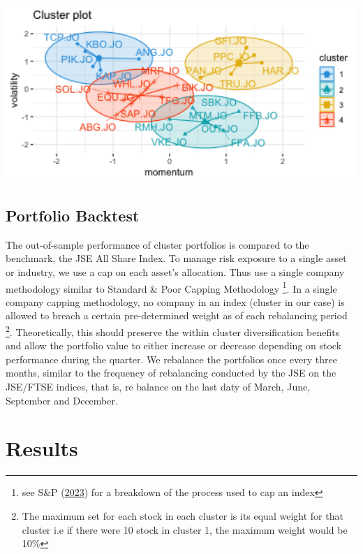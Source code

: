 \documentclass[11pt,preprint, authoryear]{elsarticle}
\let\origfigure\figure
\let\endorigfigure\endfigure
\renewenvironment{figure}[1][2] {
    \expandafter\origfigure\expandafter[H]
} {
    \endorigfigure
}
\numberwithin{equation}{section}
\numberwithin{figure}{section}
\numberwithin{table}{section}
\let\rmarkdownfootnote\footnote%
\def\footnote{\protect\rmarkdownfootnote}
\begin{document}
\begin{figure}[H]

\includegraphics[width=5.56in]{images/clusters_image} \hfill{}

\caption{ Clusters Results from Highest Silhoutte \label{fig2}}\label{fig:unnamed-chunk-2}
\end{figure}

\hypertarget{portfolio-backtest}{%
\subsection{\texorpdfstring{Portfolio Backtest
\label{back}}{Portfolio Backtest }}\label{portfolio-backtest}}

The out-of-sample performance of cluster portfolios is compared to the
benchmark, the JSE All Share Index. To manage risk exposure to a single
asset or industry, we use a cap on each asset's allocation. Thus use a
single company methodology similar to Standard \& Poor Capping
Methodology \footnote{see S\&P (\protect\hyperlink{ref-sp}{2023}) for a
  breakdown of the process used to cap an index}. In a single company
capping methodology, no company in an index (cluster in our case) is
allowed to breach a certain pre-determined weight as of each rebalancing
period \footnote{The maximum set for each stock in each cluster is its
  equal weight for that cluster i.e if there were 10 stock in cluster 1,
  the maximum weight would be 10\%}. Theoretically, this should preserve
the within cluster diversification benefits and allow the portfolio
value to either increase or decrease depending on stock performance
during the quarter. We rebalance the portfolios once every three months,
similar to the frequency of rebalancing conducted by the JSE on the
JSE/FTSE indices, that is, re balance on the last daty of March, June,
September and December.

\hypertarget{results}{%
\section{\texorpdfstring{Results
\label{Results}}{Results }}\label{results}}
\end{document}
